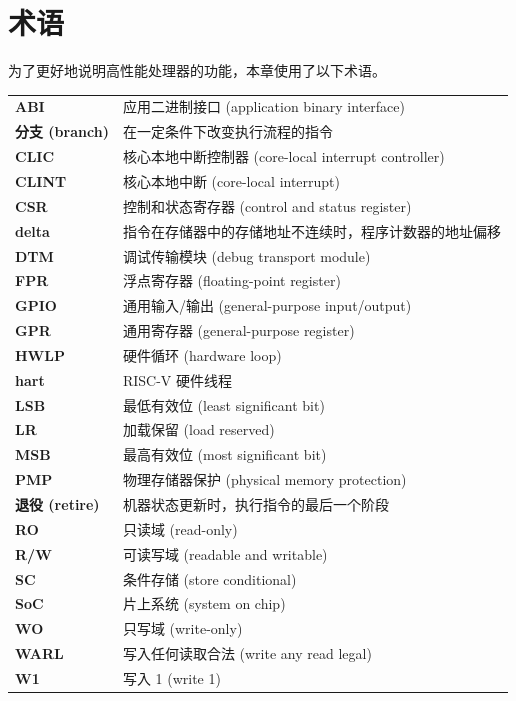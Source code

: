 \documentclass[main\_\_CN.tex]{subfiles}
\begin{document}
\section{术语}

为了更好地说明高性能处理器的功能，本章使用了以下术语。

\begin{longtable}[c]{ R{2cm} p{12cm} }
\textbf{ABI} & 应用二进制接口 (application binary interface)\\
\textbf{分支 (branch)} & 在一定条件下改变执行流程的指令 \\
\textbf{CLIC} & 核心本地中断控制器 (core-local interrupt controller)\\
\textbf{CLINT} & 核心本地中断 (core-local interrupt)\\
\textbf{CSR} & 控制和状态寄存器 (control and status register)\\
\textbf{delta} & 指令在存储器中的存储地址不连续时，程序计数器的地址偏移 \\
\textbf{DTM} & 调试传输模块 (debug transport module) \\
\textbf{FPR} & 浮点寄存器 (floating-point register)\\
\textbf{GPIO} & 通用输入/输出 (general-purpose input/output)\\
\textbf{GPR} & 通用寄存器 (general-purpose register)\\
\textbf{HWLP} & 硬件循环 (hardware loop)\\
\textbf{hart} & RISC-V 硬件线程\\
\textbf{LSB} & 最低有效位 (least significant bit)\\
\textbf{LR} & 加载保留 (load reserved)\\
\textbf{MSB} & 最高有效位 (most significant bit)\\
\textbf{PMP} & 物理存储器保护 (physical memory protection)\\
\textbf{退役 (retire)} & 机器状态更新时，执行指令的最后一个阶段 \\
\textbf{RO} & 只读域 (read-only)\\
\textbf{R/W} & 可读写域 (readable and writable)\\
\textbf{SC} & 条件存储 (store conditional)\\
\textbf{SoC} & 片上系统 (system on chip)\\
\textbf{WO} & 只写域 (write-only)\\
\textbf{WARL} & 写入任何读取合法 (write any read legal)\\
\textbf{W1} & 写入 1 (write 1)\\
\end{longtable}
\end{document}
